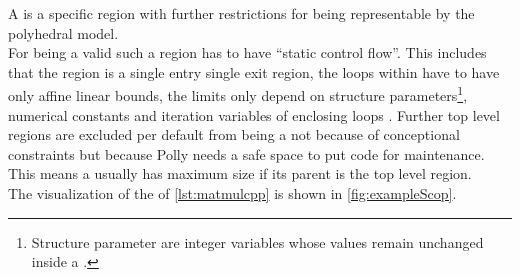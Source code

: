 A \scop is a specific region with further restrictions for being representable by the polyhedral model.\\
For being a valid \scop such a region has to have \enquote{static control flow}.
This includes that the region is a single entry single exit region, the loops within have to have only affine linear bounds, \eg the limits only depend on structure parameters\footnote{Structure parameter are integer variables whose values remain unchanged inside a \scop.}, numerical constants and iteration variables of enclosing loops \cite{GanserIterativeSchedule}. %
Further top level regions are excluded per default from being a \scop not because of conceptional constraints but because Polly needs a safe space to put code for maintenance.
This means a \scop usually has maximum size if its parent is the top level region.\\
The visualization of the \scops of \autoref{lst:matmulcpp} is shown in \autoref{fig:exampleScop}.
